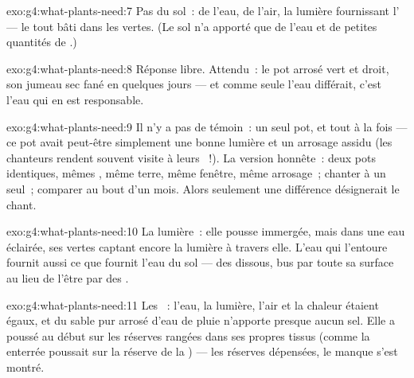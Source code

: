 \begin{solution}{exo:g4:what-plants-need:7}
Pas du sol~: de l'eau, de l'air, la lumière fournissant l'
--- le tout bâti dans les  vertes. (Le sol n'a apporté que
de l'eau et de petites quantités de .)
\end{solution}

\begin{solution}{exo:g4:what-plants-need:8}
Réponse libre. Attendu~: le pot arrosé vert et droit, son jumeau sec
fané en quelques jours --- et comme seule l'eau différait, c'est
l'eau qui en est responsable.
\end{solution}

\begin{solution}{exo:g4:what-plants-need:9}
Il n'y a pas de témoin~: un seul pot, et tout à la fois --- ce pot
avait peut-être simplement une bonne lumière et un arrosage assidu
(les chanteurs rendent souvent visite à leurs ~!). La version
honnête~: deux pots identiques, mêmes , même terre, même
fenêtre, même arrosage~; chanter à un seul~; comparer au bout d'un
mois. Alors seulement une différence désignerait le chant.
\end{solution}

\begin{solution}{exo:g4:what-plants-need:10}
La lumière~: elle pousse immergée, mais dans une eau éclairée, ses
 vertes captant encore la lumière à travers elle. L'eau qui
l'entoure fournit aussi ce que fournit l'eau du sol --- des  dissous, bus par toute sa surface au lieu de l'être par des
.
\end{solution}

\begin{solution}{exo:g4:what-plants-need:11}
Les ~: l'eau, la lumière, l'air et la chaleur étaient
égaux, et du sable pur arrosé d'eau de pluie n'apporte presque aucun
sel. Elle a poussé au début sur les réserves rangées dans ses
propres tissus (comme la  enterrée poussait sur la
réserve de la ) --- les réserves dépensées, le manque s'est
montré.
\end{solution}
